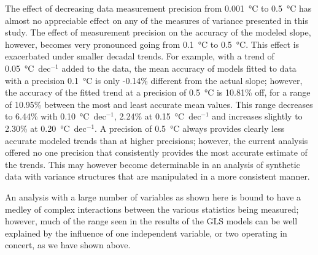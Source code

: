 \documentclass[]{ametsoc}
\begin{document}
The effect of decreasing data measurement precision from \SI{0.001}{\degreeCelsius} to \SI{0.5}{\degreeCelsius} has almost no appreciable effect on any of the measures of variance presented in this study. The effect of measurement precision on the accuracy of the modeled slope, however, becomes very pronounced going from \SI{0.1}{\degreeCelsius} to \SI{0.5}{\degreeCelsius}. This effect is exacerbated under smaller decadal trends. For example, with a trend of \SI{0.05}{\degreeCelsius}~dec$^{-1}$ added to the data, the mean accuracy of models fitted to data with a precision \SI{0.1}{\degreeCelsius} is only -0.14\% different from the actual slope; however, the accuracy of the fitted trend at a precision of \SI{0.5}{\degreeCelsius} is 10.81\% off, for a range of 10.95\% between the most and least accurate mean values. This range decreases to 6.44\% with \SI{0.10}{\degreeCelsius}~dec$^{-1}$, 2.24\% at \SI{0.15}{\degreeCelsius}~dec$^{-1}$ and increases slightly to 2.30\% at \SI{0.20}{\degreeCelsius}~dec$^{-1}$. A precision of \SI{0.5}{\degreeCelsius} always provides clearly less accurate modeled trends than at higher precisions; however, the current analysis offered no one precision that consistently provides the most accurate estimate of the trends. This may however become determinable in an analysis of synthetic data with variance structures that are manipulated in a more consistent manner.


An analysis with a large number of variables as shown here is bound to have a medley of complex interactions between the various statistics being measured; however, much of the range seen in the results of the GLS models can be well explained by the influence of one independent variable, or two operating in concert, as we have shown above.

\end{document}
